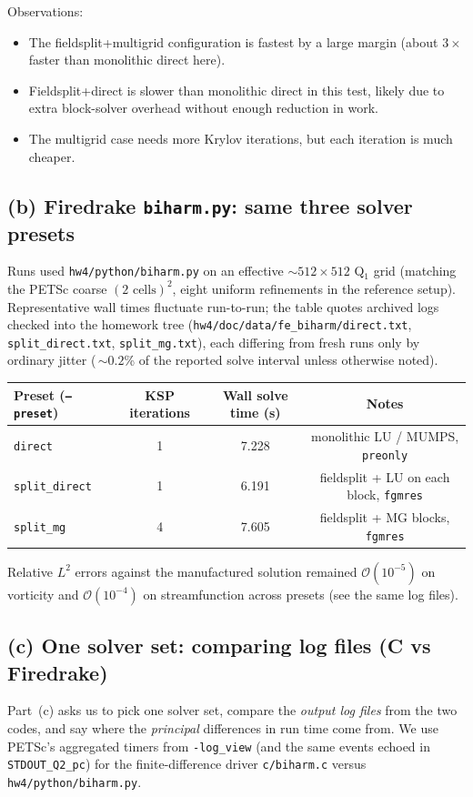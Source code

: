 \documentclass[11pt]{article}
\begin{document}
Observations:
\begin{itemize}
  \item The fieldsplit+multigrid configuration is fastest by a large margin (about $3\times$ faster than monolithic direct here).
  \item Fieldsplit+direct is slower than monolithic direct in this test, likely due to extra block-solver overhead without enough reduction in work.
  \item The multigrid case needs more Krylov iterations, but each iteration is much cheaper.
\end{itemize}

\subsection*{(b) Firedrake \texttt{biharm.py}: same three solver presets}
Runs used \texttt{hw4/python/biharm.py} on an effective $\sim 512\times 512$ Q$_1$ grid (matching the PETSc coarse $(2\text{ cells})^2$, eight uniform refinements in the reference setup). Representative wall times fluctuate run-to-run; the table quotes archived logs checked into the homework tree (\texttt{hw4/doc/data/fe\_biharm/direct.txt}, \texttt{split\_direct.txt}, \texttt{split\_mg.txt}), each differing from fresh runs only by ordinary jitter (\,$\sim\! 0.2$\%{} of the reported solve interval unless otherwise noted).

\begin{center}
\begin{tabular}{lccc}
\toprule
Preset (\texttt{--preset}) & KSP iterations & Wall solve time (s) & Notes \\
\midrule
\texttt{direct} & 1 & 7.228 & monolithic LU / MUMPS, \texttt{preonly} \\
\texttt{split\_direct} & 1 & 6.191 & fieldsplit + LU on each block, \texttt{fgmres} \\
\texttt{split\_mg} & 4 & 7.605 & fieldsplit + MG blocks, \texttt{fgmres} \\
\bottomrule
\end{tabular}
\end{center}

Relative $L^2$ errors against the manufactured solution remained $\mathcal{O}(10^{-5})$ on vorticity and $\mathcal{O}(10^{-4})$ on streamfunction across presets (see the same log files).

\subsection*{(c) One solver set: comparing log files (C vs Firedrake)}
Part~(c) asks us to pick one solver set, compare the \emph{output log files} from the two codes, and say where the \emph{principal} differences in run time come from. We use PETSc's aggregated timers from \texttt{-log\_view} (and the same events echoed in \texttt{STDOUT\_Q2\_pc}) for the finite-difference driver \texttt{c/biharm.c} versus \texttt{hw4/python/biharm.py}.
\end{document}
